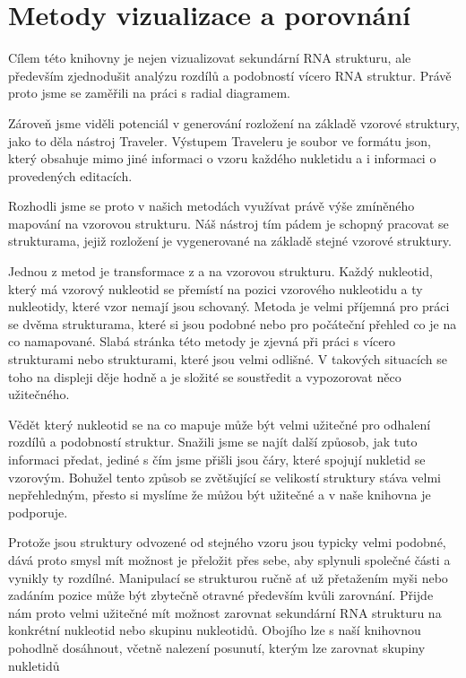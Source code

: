 
\chapter{Metody vizualizace a porovnání}

Cílem této knihovny je nejen vizualizovat sekundární RNA strukturu, ale
především zjednodušit analýzu rozdílů a podobností vícero RNA struktur. Právě
proto jsme se zaměřili na práci s radial diagramem.

Zároveň jsme viděli potenciál v generování rozložení na základě vzorové
struktury, jako to děla nástroj Traveler. Výstupem Traveleru je soubor ve
formátu json, který obsahuje mimo jiné informaci o vzoru každého nukletidu a i
informaci o provedených editacích.

Rozhodli jsme se proto v našich metodách využívat právě výše zmíněného mapování
na vzorovou strukturu. Náš nástroj tím pádem je schopný pracovat se
strukturama, jejiž rozložení je vygenerované na základě stejné vzorové
struktury.

Jednou z metod je transformace z a na vzorovou strukturu. Každý nukleotid,
který má vzorový nukleotid se přemístí na pozici vzorového nukleotidu a ty
nukleotidy, které vzor nemají jsou schovaný. Metoda je velmi příjemná pro práci
se dvěma strukturama, které si jsou podobné nebo pro počáteční přehled co je na
co namapované. Slabá stránka této metody je zjevná při práci s vícero
strukturami nebo strukturami, které jsou velmi odlišné. V takových situacích se
toho na displeji děje hodně a je složité se soustředit a vypozorovat něco
užitečného.

Vědět který nukleotid se na co mapuje může být velmi užitečné pro odhalení
rozdílů a podobností struktur. Snažili jsme se najít další způosob, jak tuto
informaci předat, jediné s čím jsme přišli jsou čáry, které spojují nukletid se
vzorovým. Bohužel tento způsob se zvětšující se velikostí struktury stáva velmi
nepřehledným, přesto si myslíme že můžou být užitečné a v naše knihovna je
podporuje.

Protože jsou struktury odvozené od stejného vzoru jsou typicky velmi podobné,
dává proto smysl mít možnost je přeložit přes sebe, aby splynuli společné části
a vynikly ty rozdílné. Manipulací se strukturou ručně ať už přetažením myši
nebo zadáním pozice může být zbytečně otravné především kvůli zarovnání. Přijde
nám proto velmi užitečné mít možnost zarovnat sekundární RNA strukturu na
konkrétní nukleotid nebo skupinu nukleotidů. Obojího lze s naší knihovnou
pohodlně dosáhnout, včetně nalezení posunutí, kterým lze zarovnat skupiny
nukletidů

